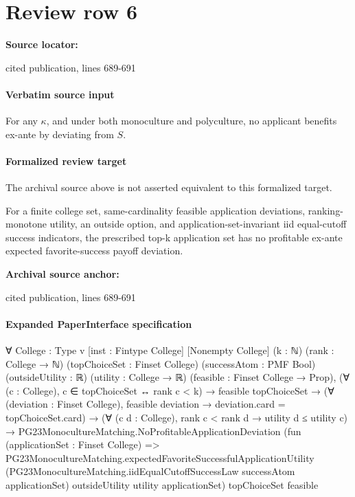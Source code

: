 \documentclass[10pt]{article}
\begin{document}
\section*{Review row 6}
\textbf{Source locator:} {\footnotesize\raggedright cited publication, lines 689-\allowbreak{}691\par}
\paragraph{Verbatim source input}
\begin{ReviewVerbatim}
\begin{proposition}\label{prop:nash}
    For any $\kappa$, and under both monoculture and polyculture, no applicant benefits ex-ante by deviating from $S$.
\end{proposition}
\end{ReviewVerbatim}


\paragraph{Formalized review target}
The archival source above is not asserted equivalent to this formalized target.
\begin{ReviewVerbatim}
For a finite college set, same-cardinality feasible application deviations, ranking-monotone utility, an outside option, and application-set-invariant iid equal-cutoff success indicators, the prescribed top-k application set has no profitable ex-ante expected favorite-success payoff deviation.
\end{ReviewVerbatim}

\textbf{Archival source anchor:} {\footnotesize\raggedright cited publication, lines 689-\allowbreak{}691\par}
\paragraph{Expanded PaperInterface specification}
\begin{ReviewVerbatim}
∀ {College : Type v} [inst : Fintype College] [Nonempty College] (k : ℕ) (rank : College → ℕ)
  (topChoiceSet : Finset College) (successAtom : PMF Bool) (outsideUtility : ℝ) (utility : College → ℝ)
  (feasible : Finset College → Prop),
  (∀ (c : College), c ∈ topChoiceSet ↔ rank c < k) →
    feasible topChoiceSet →
      (∀ (deviation : Finset College), feasible deviation → deviation.card = topChoiceSet.card) →
        (∀ (c d : College), rank c < rank d → utility d ≤ utility c) →
          PG23MonocultureMatching.NoProfitableApplicationDeviation
            (fun (applicationSet : Finset College) =>
              PG23MonocultureMatching.expectedFavoriteSuccessfulApplicationUtility
                (PG23MonocultureMatching.iidEqualCutoffSuccessLaw successAtom applicationSet) outsideUtility utility
                applicationSet)
            topChoiceSet feasible
\end{ReviewVerbatim}
\end{document}
